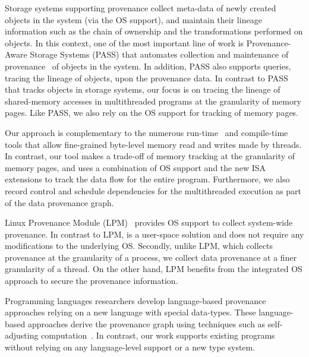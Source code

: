 

 Storage systems supporting provenance collect meta-data of newly created objects in the system (via the OS support), 
and  maintain their lineage information such as the chain of ownership and the transformations performed on objects. In this context, one of the most important line of work is Provenance-Aware Storage Systems (PASS) that automates collection and maintenance of provenance~\cite{pass-atc} of objects in the system. In addition, PASS also supports queries, tracing the lineage of objects, upon the provenance data. 
In contrast to PASS that tracks objects in storage systems, our focus is on tracing the lineage of shared-memory accesses in multithreaded programs at the granularity of memory pages. Like PASS, we also rely on the OS support for tracking of memory pages.


 Our approach is complementary to the numerous run-time~\cite{valgrind,memtrace} and compile-time~\cite{cgo-compiler-provenance} tools that allow fine-grained byte-level memory read and writes made by threads. In contrast, our tool makes a trade-off of memory tracking at the granularity of memory pages, and uses a combination of OS support and the new ISA extensions to track the data flow for the entire program. Furthermore, we also record control and schedule dependencies for the multithreaded execution as part of the data provenance graph. 


 Linux Provenance Module (LPM)~\cite{lpm} provides OS support to collect system-wide provenance. In contrast to LPM, \projecttitle is a user-space solution and does not require any modifications to the underlying OS. Secondly, unlike LPM, which collects provenance at the granularity of a process, we collect data provenance at a finer granularity of a thread.  On the other hand, LPM benefits from the integrated OS approach to secure the provenance information. 

 Programming languages researchers develop language-based provenance approaches relying on a new language with special data-types. These language-based approaches derive the provenance graph using techniques such as self-adjusting computation~\cite{Acar05}. In contrast, our work supports existing programs without relying on any language-level support or a new type system.




